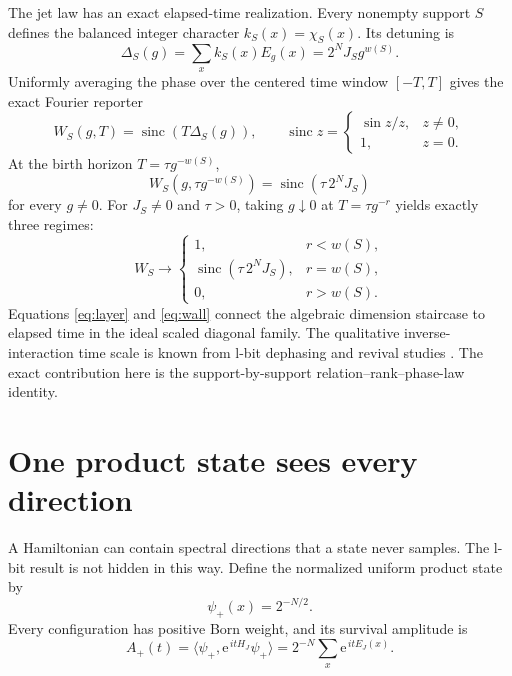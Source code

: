 \documentclass[10pt]{article}
\theoremstyle{definition}
\newcommand{\sinc}{\operatorname{sinc}}
\begin{document}
The jet law has an exact elapsed-time realization. Every nonempty support
\(S\) defines the balanced integer character \(k_S(x)=\chi_S(x)\). Its
detuning is
\begin{equation}
 \Delta_S(g)=\sum_x k_S(x)E_g(x)
 =2^N J_Sg^{w(S)}.
 \label{eq:detuning}
\end{equation}
Uniformly averaging the phase over the centered time window \([-T,T]\)
gives the exact Fourier reporter
\begin{equation}
 W_S(g,T)=\sinc\!\left(T\Delta_S(g)\right),
 \qquad
 \sinc z=
 \begin{cases}\sin z/z,&z\ne0,\\1,&z=0.\end{cases}
 \label{eq:reporter}
\end{equation}
At the birth horizon \(T=\tau g^{-w(S)}\),
\begin{equation}
 \boxed{
 W_S(g,\tau g^{-w(S)})
 =\sinc(\tau\,2^NJ_S)}
 \label{eq:birth}
\end{equation}
for every \(g\ne0\). For \(J_S\ne0\) and \(\tau>0\), taking
\(g\downarrow0\) at
\(T=\tau g^{-r}\) yields exactly three regimes:
\begin{equation}
 W_S\longrightarrow
 \begin{cases}
  1,&r<w(S),\\
  \sinc(\tau\,2^NJ_S),&r=w(S),\\
  0,&r>w(S).
 \end{cases}
 \label{eq:wall}
\end{equation}
Equations \eqref{eq:layer} and \eqref{eq:wall} connect the algebraic
dimension staircase to elapsed time in the ideal scaled diagonal family.
The qualitative inverse-interaction time scale is known from l-bit
dephasing and revival studies
\cite{HuseNandkishoreOganesyan2014,VasseurParameswaranMoore2015}.
The exact contribution here is the support-by-support
relation--rank--phase-law identity.

\section{One product state sees every direction}

A Hamiltonian can contain spectral directions that a state never samples.
The l-bit result is not hidden in this way. Define the normalized uniform
product state by
\begin{equation}
 \psi_+(x)=2^{-N/2}.
 \label{eq:plus}
\end{equation}
Every configuration has positive Born weight, and its survival amplitude is
\begin{equation}
 A_+(t)=
 \langle\psi_+,\mathrm e^{\,itH_J}\psi_+\rangle
 =2^{-N}\sum_x\mathrm e^{\,itE_J(x)}.
 \label{eq:survival}
\end{equation}
\end{document}
